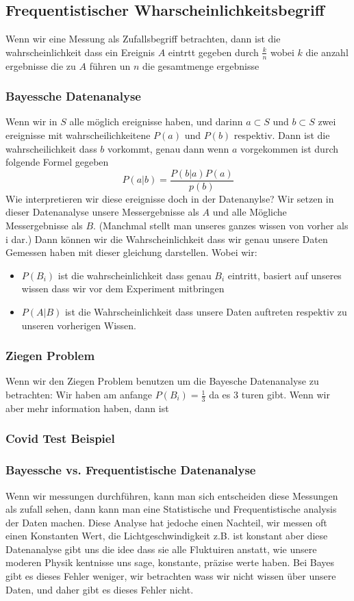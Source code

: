 \documentclass{article}
\begin{document}
\subsection*{Frequentistischer Wharscheinlichkeitsbegriff}
Wenn wir eine Messung als Zufallsbegriff betrachten, dann ist die wahrscheinlichkeit dass ein Ereignis $A$ eintrtt gegeben durch $\frac{k}{n}$ wobei $k$ die anzahl ergebnisse die zu $A$ führen un $n$ die gesamtmenge ergebnisse
\subsubsection*{Bayessche Datenanalyse}
Wenn wir in $S$ alle möglich ereignisse haben, und darinn $a\subset S$ und $b\subset S$ zwei ereignisse mit wahrscheilichkeitene $P(a)$ und $P(b)$ respektiv. Dann ist die wahrscheilichkeit dass $b$ vorkommt, genau dann wenn $a$ vorgekommen ist durch folgende Formel gegeben
\[P(a|b)=\frac{P(b|a)P(a)}{p(b)}\]
Wie interpretieren wir diese ereignisse doch in der Datenanylse? Wir setzen in dieser Datenanalyse unsere Messergebnisse als $A$ und alle Mögliche Messergebnisse als $B$. (Manchmal stellt man unseres ganzes wissen von vorher als i dar.) Dann können wir die Wahrscheinlichkeit dass wir genau unsere Daten Gemessen haben mit dieser gleichung darstellen.
Wobei wir:\begin{itemize}
  \item{$P(B_i)$ ist die wahrscheinlichkeit dass genau $B_i$ eintritt, basiert auf unseres wissen dass wir vor dem Experiment mitbringen}
  \item{$P(A|B)$ ist die Wahrscheinlichkeit dass unsere Daten auftreten respektiv zu unseren vorherigen Wissen.}
\end{itemize}
\subsubsection*{Ziegen Problem}
Wenn wir den Ziegen Problem benutzen um die Bayesche Datenanalyse zu betrachten:
Wir haben am anfange $P(B_i)=\frac{1}{3}$ da es $3$ turen gibt. Wenn wir aber mehr information haben, dann ist 


\subsubsection*{Covid Test Beispiel}


\subsubsection*{Bayessche vs. Frequentistische Datenanalyse} Wenn wir messungen durchführen, kann man sich entscheiden diese Messungen als zufall sehen, dann kann man eine Statistische und Frequentistische analysis der Daten machen.
Diese Analyse hat jedoche einen Nachteil, wir messen oft einen Konstanten Wert, die Lichtgeschwindigkeit z.B. ist konstant aber diese Datenanalyse gibt uns die idee dass sie alle Fluktuiren anstatt, wie unsere moderen Physik kentnisse uns sage, konstante, präzise werte haben.
Bei Bayes gibt es dieses Fehler weniger, wir betrachten wass wir nicht wissen über unsere Daten, und daher gibt es dieses Fehler nicht.
\end{document}
